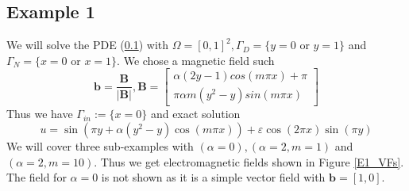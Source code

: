 \documentclass[12pt,a4paper]{article}
\begin{document}
\subsection{Example 1}
We will solve the PDE (\ref{}) with $\Omega = [0,1]^2, \Gamma_D = \{y=0 \text{ or } y=1\}$ and $\Gamma_N = \{x=0 \text{ or } x=1\}$. We chose a magnetic field such
\begin{equation} \label{E1_b}
\mathbf{b} = \frac{\mathbf{B}}{|\mathbf{B}|}, 
\mathbf{B} = \left[ \begin{matrix}
\alpha(2y-1)cos(m\pi x) + \pi\\
\pi \alpha m (y^2-y)sin(m \pi x)
\end{matrix} \right]
\end{equation}
Thus we have $\Gamma_{in} := \{x=0\}$ and exact solution
\begin{equation}
u = \sin(\pi y + \alpha (y^2-y) \cos(m\pi x)) + \varepsilon \cos(2 \pi x) \sin(\pi y)
\end{equation}
We will cover three sub-examples with $(\alpha=0),(\alpha=2,m=1)$ and $(\alpha = 2, m=10)$. Thus we get electromagnetic fields  shown in Figure \ref{E1_VFs}. The field for $\alpha = 0$ is not shown as it is a simple vector field with $\mathbf{b}= [1, 0]$.
\end{document}
